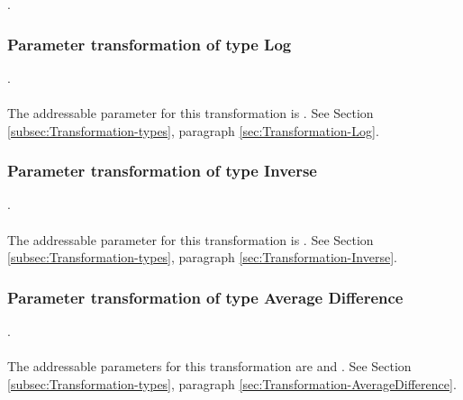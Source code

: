 .
\label{syntax:Transformation}





\subsubsection{Parameter transformation of type Log}
.
\label{syntax:Transformation-Log} \\ \\
The addressable parameter for this transformation is . See Section \ref{subsec:Transformation-types}, paragraph \ref{sec:Transformation-Log}.

\subsubsection{Parameter transformation of type Inverse}
.
\label{syntax:Transformation-Inverse}  \\ \\
The addressable parameter for this transformation is . See Section \ref{subsec:Transformation-types}, paragraph \ref{sec:Transformation-Inverse}.

\subsubsection{Parameter transformation of type Average Difference}
.
\label{syntax:Transformation-AverageDifference} \\ \\
The addressable parameters for this transformation are  and . See Section \ref{subsec:Transformation-types}, paragraph \ref{sec:Transformation-AverageDifference}.

